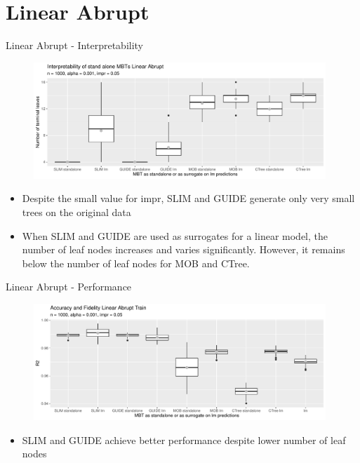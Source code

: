 \documentclass[9pt, xcolor=table]{beamer}
\begin{document}
\section{Linear Abrupt}
\begin{frame}{Linear Abrupt - Interpretability}

\begin{figure}
    \includegraphics[width=11cm]{Figures/simulations/batchtools/basic_scenarios/linear_abrupt/la_1000_standalone_lm_int.pdf}
\end{figure}    
\begin{itemize}
    \item Despite the small value for impr, SLIM and GUIDE generate only very small trees on the original data 
    \item When SLIM and GUIDE are used as surrogates for a linear model, the number of leaf nodes increases and varies significantly. However, it remains below the number of leaf nodes for MOB and CTree.
\end{itemize}
\end{frame}


\begin{frame}{Linear Abrupt - Performance}
\begin{figure}
    \includegraphics[width=11cm]{Figures/simulations/batchtools/basic_scenarios/linear_abrupt/la_1000_standalone_lm_r2_train.pdf}
\end{figure}     
\begin{itemize}
    \item SLIM and GUIDE achieve better performance despite lower number of leaf nodes
\end{itemize}
\end{frame}
\end{document}

